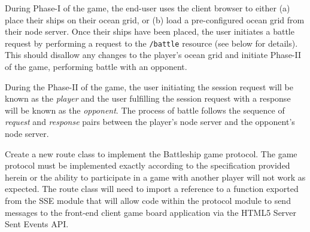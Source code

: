 \documentclass[10pt]{article}
\begin{document}
\begin{center}
\end{center}

During Phase-I of the game, the end-user uses the client browser to either (a) place their ships on their ocean grid, or (b) load a pre-configured ocean grid from their node server. Once their ships have been placed, the user initiates a battle request by performing a request to the \verb|/battle| resource (see below for details). This should disallow any changes to the player's ocean grid and initiate Phase-II of the game, performing battle with an opponent. 

During the Phase-II of the game, the user initiating the session request will be known as the \emph{player} and the user fulfilling the session request with a response will be known as the \emph{opponent}. The process of battle follows the sequence of \emph{request} and \emph{response} pairs between the player's node server and the opponent's node server. 

Create a new route class to implement the Battleship game protocol. The game protocol must be implemented exactly according to the specification provided herein or the ability to participate in a game with another player will not work as expected. The route class will need to import a reference to a function exported from the SSE module that will allow code within the protocol module to send messages to the front-end client game board application via the HTML5 Server Sent Events API. 
\end{document}
